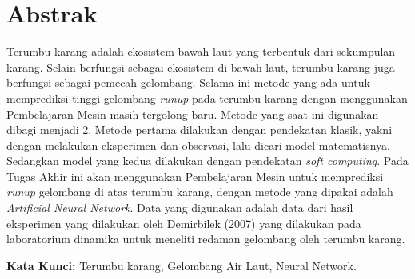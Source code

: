 \chapter*{Abstrak}
Terumbu karang adalah ekosistem bawah laut yang terbentuk dari sekumpulan karang. Selain berfungsi sebagai ekosistem di bawah laut, terumbu karang juga berfungsi sebagai pemecah gelombang. Selama ini metode yang ada untuk memprediksi tinggi gelombang \emph{runup} pada terumbu karang dengan menggunakan Pembelajaran Mesin masih tergolong baru. Metode yang saat ini digunakan dibagi menjadi 2. Metode pertama dilakukan dengan pendekatan klasik, yakni dengan melakukan eksperimen dan observasi, lalu dicari model matematisnya. Sedangkan model yang kedua dilakukan dengan pendekatan \emph{soft computing}. Pada Tugas Akhir ini akan menggunakan Pembelajaran Mesin untuk memprediksi \emph{runup} gelombang di atas terumbu karang, dengan metode yang dipakai adalah \emph{Artificial Neural Network}. Data yang digunakan adalah data dari hasil eksperimen yang dilakukan oleh Demirbilek (2007) \cite{DemirbilekReport} yang dilakukan pada laboratorium dinamika untuk meneliti redaman gelombang oleh terumbu karang.
\vspace{0.5 cm}
\begin{flushleft}
{\textbf{Kata Kunci:} Terumbu karang, Gelombang Air Laut, Neural Network.}
\end{flushleft}